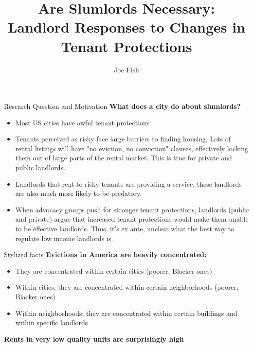 \documentclass[10pt, xcolor=dvipsnames]{beamer}
\date{}
\title[Landlord Responses to Changes in Tenant Protections]{Are Slumlords Necessary: \\Landlord Responses to Changes in Tenant Protections} %
\author[Joe Fish]{Joe Fish}
\begin{document}
\begin{frame}
\titlepage %
\end{frame}


\begin{frame}{Research Question and Motivation}
   \textbf{ What does a city do about slumlords?}
   \begin{itemize}
    \item Most US cities have awful tenant protections
    \item Tenants perceived as risky face large barriers to finding housing. Lots of rental listings will have "no eviction, no conviction" clauses, effectively locking them out of large parts of the rental market. This is true for private and public landlords.
    \item Landlords that rent to risky tenants are providing a service, these landlords are also much more likely to be predatory.
    \item When advocacy groups push for stronger tenant protections, landlords (public and private) argue that increased tenant protections would make them unable to be effective landlords. Thus, it's ex ante, unclear what the best way to regulate low income landlords is.
\end{itemize}
\end{frame}

\begin{frame}{Stylized facts}
    \textbf{Evictions in America are heavily concentrated:}
\begin{itemize}
    \item They are concentrated within certain cities (poorer, Blacker ones)
    \item Within cities, they are concentrated within certain neighborhoods (poorer, Blacker ones)
    \item Within neighborhoods, they are concentrated within certain buildings and within specific landlords 
\end{itemize} 

    \textbf{Rents in very low quality units are surprisingly high }
\end{frame}
\end{document}
